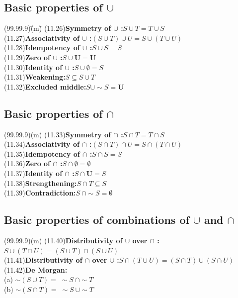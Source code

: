 \documentclass{amsart}
\newcommand{\lgap}{2pt}                             %
\begin{document}
\subsection*{Basic properties of $\cup$}
\begin{tabbing}
(99.99.9)\;\=(m)\;\=\kill
(11.26)\>\textbf{Symmetry of $\cup$ :}\quad $S\cup T = T\cup S$\\[\lgap]
(11.27)\>\textbf{Associativity of $\cup$ :}\quad $(S\cup T)\cup U = S\cup (T\cup U)$\\[\lgap]
(11.28)\>\textbf{Idempotency of $\cup$ :}\quad $S\cup S = S$\\[\lgap]
(11.29)\>\textbf{Zero of $\cup$ :}\quad $S\cup \mathbf{U} = \mathbf{U}$\\[\lgap]
(11.30)\>\textbf{Identity of $\cup$ :}\quad $S\cup \emptyset = S$\\[\lgap]
(11.31)\>\textbf{Weakening:}\quad $S\subseteq S\cup T$\\[\lgap]
(11.32)\>\textbf{Excluded middle:}\quad $S \cup \sim S = \mathbf{U}$\\[\lgap]
\end{tabbing}

\subsection*{Basic properties of $\cap$}
\begin{tabbing}
(99.99.9)\;\=(m)\;\=\kill
(11.33)\>\textbf{Symmetry of $\cap$ :}\quad $S\cap T = T\cap S$\\[\lgap]
(11.34)\>\textbf{Associativity of $\cap$ :}\quad $(S\cap T)\cap U = S\cap (T\cap U)$\\[\lgap]
(11.35)\>\textbf{Idempotency of $\cap$ :}\quad $S\cap S = S$\\[\lgap]
(11.36)\>\textbf{Zero of $\cap$ :}\quad $S\cap \emptyset = \emptyset$\\[\lgap]
(11.37)\>\textbf{Identity of $\cap$ :}\quad $S\cap \mathbf{U} = S$\\[\lgap]
(11.38)\>\textbf{Strengthening:}\quad $S\cap T\subseteq S$\\[\lgap]
(11.39)\>\textbf{Contradiction:}\quad $S\: \cap \sim S = \emptyset$\\[\lgap]
\end{tabbing}

\subsection*{Basic properties of combinations of $\cup$ and $\cap$}
\begin{tabbing}
(99.99.9)\;\=(m)\;\=\kill
(11.40)\>\textbf{Distributivity of $\cup$ over $\cap$ :}\quad $S\cup (T\cap U) = (S\cup T)\cap (S\cup U)$\\[\lgap]
(11.41)\>\textbf{Distributivity of $\cap$ over $\cup$ :}\quad $S\cap (T\cup U) = (S\cap T)\cup (S\cap U)$\\[\lgap]
(11.42)\>\textbf{De Morgan:}\\[\lgap]
       \>(a)\> $\sim (S\cup T) =\; \sim S\:\cap \sim T$\\[\lgap]
       \>(b)\> $\sim (S\cap T) =\; \sim S\:\cup \sim T$\\[\lgap]
\end{tabbing}
\end{document}
